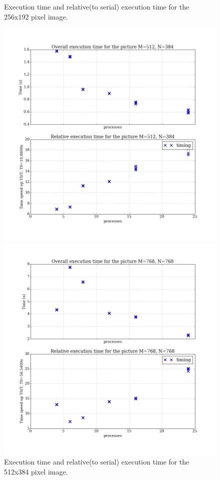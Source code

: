 \documentclass[11pt]{article}
\begin{document}
\begin{figure}[H]
\begin{minipage}[b]{.5\textwidth}
			\caption{Execution time and relative(to serial) execution time for the 256x192 pixel image.}\label{exec_2}
		\end{minipage}
	\end{figure}
	
	\begin{figure}[ht]	
		\centering
		\begin{minipage}[b]{.5\textwidth}
			\centering
			\includegraphics[width=\linewidth]{exec_512x384.jpeg}
			\caption{Execution time and relative(to serial) execution time for the 512x384 pixel image.}\label{exec_3}
		\end{minipage}%
		\begin{minipage}[b]{.5\textwidth}
			\centering
			\includegraphics[width=\linewidth]{exec_768x768.jpeg}

\end{minipage}
\end{figure}
\end{document}
